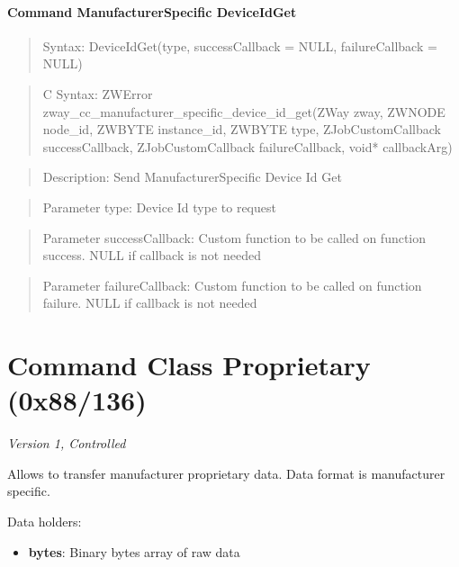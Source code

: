 \paragraph{Command ManufacturerSpecific DeviceIdGet}
\begin{quote}Syntax: DeviceIdGet(type, successCallback = NULL, failureCallback = NULL)\end{quote}
\begin{quote}C Syntax: ZWError zway\_cc\_manufacturer\_specific\_device\_id\_get(ZWay zway, ZWNODE node\_id, ZWBYTE instance\_id, ZWBYTE type, ZJobCustomCallback successCallback, ZJobCustomCallback failureCallback, void* callbackArg)\end{quote}
\begin{quote}Description: Send ManufacturerSpecific Device Id Get\end{quote}
\begin{quote}Parameter type: Device Id type to request\end{quote}
\begin{quote}Parameter successCallback: Custom function to be called on function success. NULL if callback is not needed\end{quote}
\begin{quote}Parameter failureCallback: Custom function to be called on function failure. NULL if callback is not needed\end{quote}



\section{Command Class Proprietary (0x88/136)}

\textit{Version 1, Controlled}
\newline

Allows to transfer manufacturer proprietary data. Data format is manufacturer specific.
\newline

\noindent
Data holders:

\begin{itemize}
\item \textbf{bytes}: Binary bytes array of raw data
\end{itemize}


